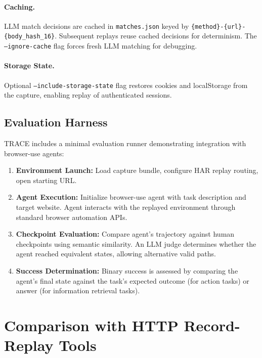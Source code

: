 \documentclass[letterpaper]{article}
\begin{document}
\paragraph{Caching.} LLM match decisions are cached in \texttt{matches.json} keyed by \texttt{\{method\}-\{url\}-\{body\_hash\_16\}}. Subsequent replays reuse cached decisions for determinism. The \texttt{--ignore-cache} flag forces fresh LLM matching for debugging.

\paragraph{Storage State.} Optional \texttt{--include-storage-state} flag restores cookies and localStorage from the capture, enabling replay of authenticated sessions.

\subsection{Evaluation Harness}

TRACE includes a minimal evaluation runner demonstrating integration with browser-use agents:

\begin{enumerate}
    \item \textbf{Environment Launch:} Load capture bundle, configure HAR replay routing, open starting URL.
    \item \textbf{Agent Execution:} Initialize browser-use agent with task description and target website. Agent interacts with the replayed environment through standard browser automation APIs.
    \item \textbf{Checkpoint Evaluation:} Compare agent's trajectory against human checkpoints using semantic similarity. An LLM judge determines whether the agent reached equivalent states, allowing alternative valid paths.
    \item \textbf{Success Determination:} Binary success is assessed by comparing the agent's final state against the task's expected outcome (for action tasks) or answer (for information retrieval tasks).
\end{enumerate}


\section{Comparison with HTTP Record-Replay Tools}
\label{app:replay-comparison}
\end{document}
